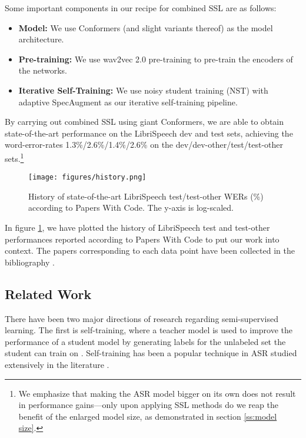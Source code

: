 \documentclass[dvipsnames]{article}
\begin{document}
Some important components in our recipe for combined SSL are as follows:
\begin{itemize}
\item \textbf{Model:} We use Conformers \cite{conformer} (and slight variants thereof) as the model architecture.
\item \textbf{Pre-training:} We use wav2vec 2.0 pre-training \cite{wav2vec2} to pre-train the encoders of the networks.
\item \textbf{Iterative Self-Training:} We use noisy student training (NST) \cite{nst, nstasr} with adaptive SpecAugment \cite{specaugment,specaugment2} as our iterative self-training pipeline.
\end{itemize}

By carrying out combined SSL using giant Conformers, we are able to obtain state-of-the-art performance on the LibriSpeech dev and test sets, achieving the word-error-rates 1.3\%/2.6\%/1.4\%/2.6\% on the dev/dev-other/test/test-other sets.\footnote{We emphasize that making the ASR model bigger on its own does not result in performance gains---only upon applying SSL methods do we reap the benefit of the enlarged model size, as demonstrated in section \ref{ss:model size}.}

\begin{figure}[h!]
\centering
\texttt{[image: figures/history.png]}
\vskip 0.05in
\caption{History of state-of-the-art LibriSpeech test/test-other WERs (\%) according to Papers With Code. The y-axis is log-scaled.}
\label{f:history}
\end{figure}

In figure \ref{f:history}, we have plotted the history of LibriSpeech test and test-other performances reported according to Papers With Code \cite{testclean, testother} to put our work into context. The papers corresponding to each data point have been collected in the bibliography \cite{wav2vec2, nstasr, specaugment, amodei2016deep, liptchinsky2017letter, xu2018neural, li2019jasper, luscher2019rwth, han2019state, synnaeve2019end, contextnet, barbier20190}.




\subsection{Related Work}

There have been two major directions of research regarding semi-supervised learning. The first is self-training, where a teacher model is used to improve the performance of a student model by generating labels for the unlabeled set the student can train on \cite{scudder1965probability,yarowsky1995unsupervised,riloff2003learning}. Self-training has been a popular technique in ASR studied extensively in the literature \cite{Zavaliagkos98utilizinguntranscribed,Lamel00lightlysupervised,Novotney2009,Thomas2013,li2019,kahn2019selftraining,synnaeve2019endtoend,parthasarathi2019,hsu2020selfsupervised}.
\end{document}
